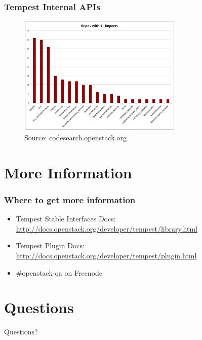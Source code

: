 \documentclass[aspectratio=169,11pt,hyperref={colorlinks=true}]{beamer}
\begin{document}
\begin{frame}
    \frametitle{Tempest Internal APIs}
    \begin{figure}[p]
    	\centering
    	\includegraphics[width=0.7\textwidth]{tempest-imports.png}
    	\caption{Source: codesearch.openstack.org}
    \end{figure}
\end{frame}

\section{More Information}
\begin{frame}
\frametitle{Where to get more information}
    \begin{itemize}
        \item Tempest Stable Interfaces Docs: \href{http://docs.openstack.org/developer/tempest/library.html}{http://docs.openstack.org/developer/tempest/library.html}
        \item Tempest Plugin Docs: \href{http://docs.openstack.org/developer/tempest/plugin.html}{http://docs.openstack.org/developer/tempest/plugin.html}
        \item \#openstack-qa on Freenode
    \end{itemize}
\end{frame}

\section{Questions}
\begin{frame}[c]
    \begin{center}
        \Huge Questions?
    \end{center}
\end{frame}

\end{document}

